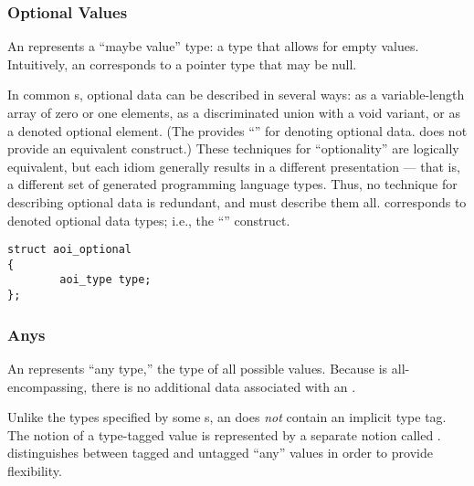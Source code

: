 
\subsubsection{Optional Values}

An  represents a ``maybe value'' type: a type that allows for
empty values.  Intuitively, an  corresponds to a pointer type
that may be null.

In common \IDL{}s, optional data can be described in several ways: as a
variable-length array of zero or one elements, as a discriminated union with a
void variant, or as a denoted optional element.  (The \ONCRPC{} \IDL{} provides
``\idl{*}'' for denoting optional data.  \CORBA{} \IDL{} does not provide an
equivalent construct.)  These techniques for ``optionality'' are logically
equivalent, but each \IDL{} idiom generally results in a different presentation
--- that is, a different set of generated programming language types.  Thus, no
technique for describing optional data is redundant, and \AOI{} must describe
them all.   corresponds to denoted optional data types; i.e.,
the \ONCRPC{} \IDL{} ``\idl{*}'' construct.

\begin{verbatim}
struct aoi_optional
{
        aoi_type type;
};
\end{verbatim}


\subsubsection{Anys}

An  represents ``any type,'' the type of all possible values.
Because  is all-encompassing, there is no additional data
associated with an \@.

Unlike the  types specified by some \IDL{}s, an  does
\emph{not} contain an implicit type tag.  The notion of a type-tagged value is
represented by a separate \AOI{} notion called \@.  \AOI{}
distinguishes between tagged and untagged ``any'' values in order to provide
flexibility.


